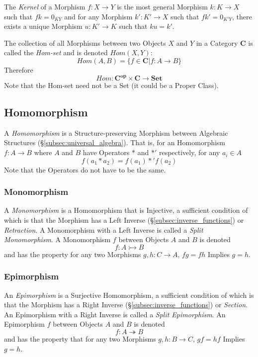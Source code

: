 The \emph{Kernel} of a Morphism $f : X \rightarrow Y$ is the most
general Morphism $k : K \rightarrow X$ such that $fk = 0_{KY}$ and for
any Morphism $k' : K' \rightarrow X$ such that $fk' = 0_{K'Y}$, there
exists a unique Morphism $u : K' \rightarrow K$ such that $ku = k'$.

The collection of all Morphisms between two Objects $X$ and $Y$ in a
Category $\mathbf{C}$ is called the \emph{Hom-set} and is denoted
$Hom(X,Y)$:
\[
    Hom(A,B) = \{f \in \mathbf{C} | f : A \rightarrow B\}
\]
Therefore
\[
    Hom : \mathbf{C^{op}} \times \mathbf{C} \rightarrow \mathbf{Set}
\]
Note that the Hom-set need not be a Set (it could be a Proper Class).

\subsection{Homomorphism}\label{subsec:homomorphism}

A \emph{Homomorphism} is a Structure-preserving Morphism between
Algebraic Structures (\S\ref{subsec:universal_algebra}). That is, for
an Homomorphism $f : A \rightarrow B$ where $A$ and $B$ have Operators
$*$ and $*'$ respectively, for any $a_i \in A$
\[
    f(a_1 * a_2) = f(a_1) *' f(a_2)
\]
Note that the Operators do not have to be the same.

\subsubsection{Monomorphism}

A \emph{Monomorphism} is a Homomorphism that is Injective, a
sufficient condition of which is that the Morphism has a Left Inverse
(\S\ref{subsec:inverse_functions}) or \emph{Retraction}. A
Monomorphism with a Left Inverse is called a \emph{Split
  Monomorphism}. A Monomorphism $f$ between Objects $A$ and $B$ is
denoted
\[
    f : A \rightarrowtail B
\]
and has the property for any two Morphisms $g, h : C \rightarrow A$,
$fg = fh$ Implies $g = h$.

\subsubsection{Epimorphism}

An \emph{Epimorphism} is a Surjective Homomorphism, a sufficient
condition of which is that the Morphism has a Right Inverse
(\S\ref{subsec:inverse_functions}) or \emph{Section}. An Epimorphism
with a Right Inverse is called a \emph{Split Epimorphism}. An
Epimorphism $f$ between Objects $A$ and $B$ is denoted
\[
    f : A \twoheadrightarrow B
\]
and has the property that for any two Morphisms $g, h : B \rightarrow
C$, $gf = hf$ Implies $g = h$.

